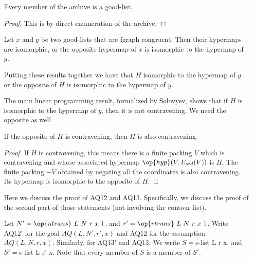 \begin{lemma}
 Every member of the archive 
is a good-list.
\end{lemma} 

\begin{proof} This is by direct enumeration of the archive.
\end{proof}

\begin{lemma}
Let $x$ and $y$ be two good-lists that are fgraph congruent.
Then their hypermaps are isomorphic, or the opposite hypermap of $x$
is isomorphic to the hypermap of $y$.
\end{lemma} 

Putting these results together we have that $H$ isomorphic to the
hypermap of $y$ or the opposite of $H$ is isomorphic to the hypermap
of $y$.

The main linear programming result, formalized by Solovyev, shows
that if $H$ is isomorphic to the hypermap of $y$, then it is not
contravening.  We need the opposite as well.

\begin{lemma}
 If the opposite of $H$ is contravening, then  $H$
is also contravening.  
\end{lemma} 

\begin{proof}
  If $H$ is contravening, this means there is a finite packing $V$
  which is contravening and whose associated hypermap
  $\op{hyp}(V,E_{std}(V))$ is $H$.  The finite packing $-V$ obtained
  by negating all the coordinates is also contravening.  Its hypermap
  is isomorphic to the opposite of $H$.
\end{proof}

\newpage
{}

Here we discuss the proof of AQ12 and AQ13.
Specifically, we discuss the proof of the second part of those statements (not
involving the contour list).

Let $N' = \op{ntrans}~ L~N~r~x~1$, and $r' = \op{rtrans}~ L ~N~r~x~1$.
Write AQ12' for the goal $AQ(L,N',r',x)$ and AQ12 for the assumption $AQ(L,N,r,x)$.
Similarly, for AQ13' and AQ13.
We write $S = $s-list L r x, and $S' = $s-list L r' x. Note that every member of $S$
is a member of $S'$.

